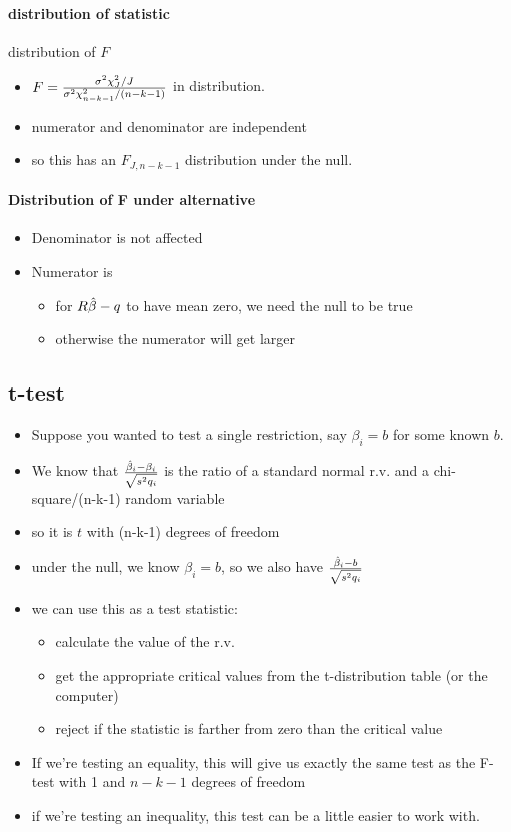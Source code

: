 \paragraph{distribution of statistic}
       distribution of $F$
\begin{itemize}
\item $F = {\sigma^2 \chi^2_J / J \over \sigma^2 \chi^2_{n-k-1} / (n-k-1)}$ in
  distribution.
\item numerator and denominator are independent
\item so this has an $F_{J, n-k-1}$ distribution under the null.
\end{itemize}

\paragraph{Distribution of F under alternative}
\begin{itemize}
\item Denominator is not affected
\item Numerator is
\begin{itemize}
\item for $R\hat{\beta} - q$ to have mean zero, we need the null to
          be true
\item otherwise the numerator will get larger
\end{itemize}
\end{itemize}

\subsection{t-test}

\begin{itemize}

\item Suppose you wanted to test a single restriction, say $\beta_i = b$
  for some known $b$.
\item We know that ${\hat{\beta}_i - \beta_i \over \sqrt{s^2 q_i}}$ is the ratio of
  a standard normal r.v. and a chi-square/(n-k-1) random variable
\item so it is $t$ with (n-k-1) degrees of freedom
\item under the null, we know $\beta_i = b$, so we also have ${\hat{\beta}_i - b
    \over \sqrt{s^2 q_i}}$
\item we can use this as a test statistic:
  \begin{itemize}
  \item calculate the value of the r.v.
  \item get the appropriate critical values from the t-distribution
    table (or the computer)
  \item reject if the statistic is farther from zero than the critical
    value
  \end{itemize}
\item If we're testing an equality, this will give us exactly the same
  test as the F-test with 1 and $n-k-1$ degrees of freedom
\item if we're testing an inequality, this test can be a little easier
  to work with.
\end{itemize}

